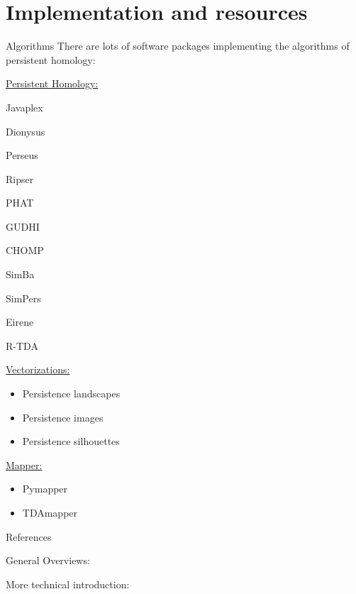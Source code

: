 \documentclass[usenames,dvipsnames,aspectratio=1610]{beamer}
\begin{document}
 \section{Implementation and resources}
\begin{frame}{Algorithms}
  There are lots of software packages implementing the algorithms of persistent homology:

  \begin{minipage}{0.4\textwidth}
    \centering
    \underline{Persistent Homology:}
  \begin{itemize}
      \begin{multicols}{2}
    \item Javaplex
    \item Dionysus
    \item Perseus
    \item {\color{red} Ripser}
    \item PHAT
    \item GUDHI
    \item CHOMP
    \item SimBa
    \item SimPers
    \item Eirene
    \item R-TDA
    \end{multicols}
  \end{itemize}
\end{minipage}
  \begin{minipage}{0.3\textwidth}
    \centering
    \underline{Vectorizations:}
  \begin{itemize}
    \item Persistence landscapes
    \item Persistence images
    \item Persistence silhouettes
  \end{itemize}
\end{minipage}
\begin{minipage}{0.25\textwidth}
  \centering
  \underline{Mapper:}
  \begin{itemize}
    \item Pymapper
    \item TDAmapper
  \end{itemize}
\end{minipage}
\end{frame}



\begin{frame}{References}
\nocite{ghrist2017homological, bubenik_statistical_2015, carlsson_topology_2009,
oudot2015persistence, perea_brief_2018, wright}

\renewcommand*{\bibfont}{\small}
General Overviews:
\printbibliography[keyword=intro]

More technical introduction:
\printbibliography[keyword=nintro]


\end{frame}
\end{document}
